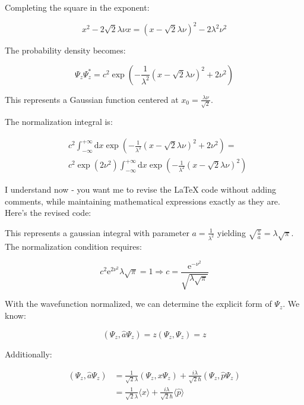 Completing the square in the exponent:

\begin{equation}
x^{2}-2 \sqrt{2} \lambda \nu x=(x-\sqrt{2} \lambda \nu)^{2}-2 \lambda^{2} \nu^{2}
\end{equation}

The probability density becomes:

\begin{equation}
\Psi_{z} \Psi_{z}^{*}=c^{2} \exp \left(-\frac{1}{\lambda^{2}}(x-\sqrt{2} \lambda \nu)^{2}+2 \nu^{2}\right)
\end{equation}

This represents a Gaussian function centered at $x_{0}=\frac{\lambda \nu}{\sqrt{2}}$.

The normalization integral is:

\begin{align}
& c^{2} \int_{-\infty}^{+\infty} \mathrm{d} x \exp \left(-\frac{1}{\lambda^{2}}(x-\sqrt{2} \lambda \nu)^{2}+2 \nu^{2}\right)= \\
& c^{2} \exp \left(2 \nu^{2}\right) \int_{-\infty}^{+\infty} \mathrm{d} x \exp \left(-\frac{1}{\lambda^{2}}(x-\sqrt{2} \lambda \nu)^{2}\right)
\end{align}

I understand now - you want me to revise the LaTeX code without adding comments, while maintaining mathematical expressions exactly as they are. Here's the revised code:


This represents a gaussian integral with parameter $a=\frac{1}{\lambda^{2}}$ yielding $\sqrt{\frac{\pi}{a}}=\lambda \sqrt{\pi}$. The normalization condition requires:

\begin{equation}
c^{2} \mathrm{e}^{2 \nu^{2}} \lambda \sqrt{\pi}=1 \Longrightarrow c=\frac{\mathrm{e}^{-\nu^{2}}}{\sqrt{\lambda \sqrt{\pi}}}
\end{equation}

With the wavefunction normalized, we can determine the explicit form of $\Psi_{z}$. We know:

\begin{equation}
\left(\Psi_{z}, \hat{a} \Psi_{z}\right)=z\left(\Psi_{z}, \Psi_{z}\right)=z
\end{equation}

Additionally:

\begin{align}
\left(\Psi_{z}, \hat{a} \Psi_{z}\right) & =\frac{1}{\sqrt{2} \lambda}\left(\Psi_{z}, x \Psi_{z}\right)+\frac{i \lambda}{\sqrt{2} \hbar}\left(\Psi_{z}, \hat{p} \Psi_{z}\right)  \\
& =\frac{1}{\sqrt{2} \lambda}\langle x\rangle+\frac{i \lambda}{\sqrt{2} \hbar}\langle\hat{p}\rangle
\end{align}


